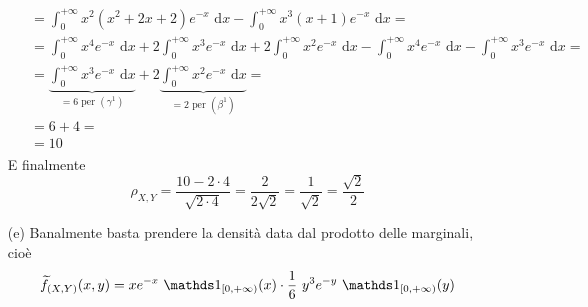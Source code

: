 \begin{enumerate}
\begin{gather*}
\begin{aligned}
&=\int_0^{+\infty}x^2(x^2+2x+2)e^{-x}\text{ d}x-\int_0^{+\infty}x^3(x+1)e^{-x}\text{ d}x=\\
&=\int_0^{+\infty}x^4e^{-x}   \text{ d}x+2\int_0^{+\infty}x^3e^{-x}   \text{ d}x+2\int_0^{+\infty}x^2e^{-x}   \text{ d}x-\int_0^{+\infty}x^4e^{-x}   \text{ d}x-\int_0^{+\infty}  x^3e^{-x} \text{ d}x=\\
&=\underbrace{\int_0^{+\infty}x^3e^{-x}   \text{ d}x}_{=6\text{ per }(\gamma^1)}+2\underbrace{\int_0^{+\infty}x^2e^{-x}   \text{ d}x}_{=2\text{ per }(\beta^1)}=\\
&=6+4=\\
&=10
\end{aligned}
\end{gather*}
E finalmente
\begin{equation*}
\rho_{X,Y}=\frac{10-2\cdot 4}{\sqrt{2\cdot 4}}=\frac{2}{2\sqrt{2}}=\frac{1}{\sqrt{2}}=\frac{\sqrt{2}}{2}
\end{equation*}
\item [(e)] Banalmente basta prendere la densità data dal prodotto delle marginali, cioè
\begin{equation*}
\widetilde{f}_{(X,Y)}(x,y)=xe^{-x}\ \Ind_{[0,+\infty)}(x)\cdot \frac{1}{6}\ y^3e^{-y}\ \Ind_{[0,+\infty)}(y)
\end{equation*}
\end{enumerate}

\Soluzione{}




































